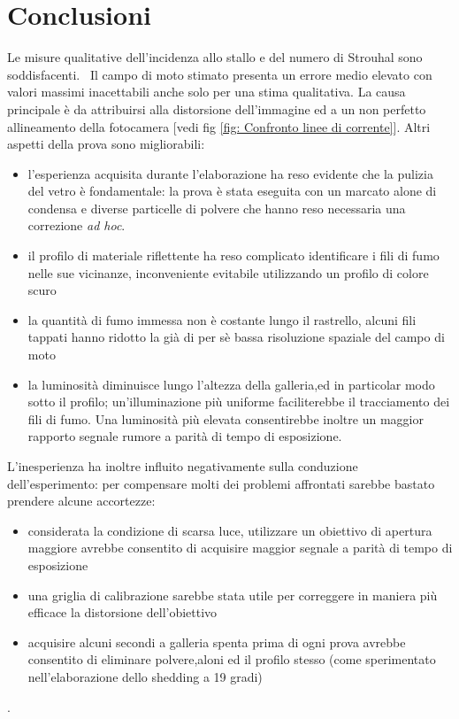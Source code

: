 \chapter{Conclusioni}
Le misure qualitative dell'incidenza allo stallo e del numero di Strouhal sono soddisfacenti. \
Il campo di moto stimato presenta un errore medio elevato con valori massimi inacettabili anche solo per una stima qualitativa. La causa principale è da attribuirsi alla distorsione dell'immagine ed a un non perfetto allineamento della fotocamera [vedi fig \ref{fig: Confronto linee di corrente}].
Altri aspetti della prova sono migliorabili:
\begin{itemize}
\item l'esperienza acquisita durante l'elaborazione ha reso evidente che la pulizia del vetro è fondamentale: la prova è stata eseguita con un marcato alone di condensa e diverse particelle di polvere che hanno reso necessaria una correzione \emph{ad hoc}.
\item il profilo di materiale riflettente ha reso complicato identificare i fili di fumo nelle sue vicinanze, inconveniente evitabile utilizzando un profilo di colore scuro
\item la quantità di fumo immessa non è costante lungo il rastrello, alcuni fili tappati hanno ridotto la già di per sè bassa risoluzione spaziale del campo di moto
\item la luminosità diminuisce lungo l'altezza della galleria,ed in particolar modo sotto il profilo; un'illuminazione più uniforme faciliterebbe il tracciamento dei fili di fumo. Una luminosità più elevata consentirebbe inoltre un maggior rapporto segnale rumore a parità di tempo di esposizione. 
\end{itemize}

L'inesperienza ha inoltre influito negativamente sulla conduzione dell'esperimento: per compensare molti dei problemi affrontati sarebbe bastato prendere alcune accortezze:
\begin{itemize}
\item considerata la condizione di scarsa luce, utilizzare un obiettivo di apertura maggiore avrebbe consentito di acquisire maggior segnale a parità di tempo di esposizione
\item una griglia di calibrazione sarebbe stata utile per correggere in maniera più efficace la distorsione dell'obiettivo
\item acquisire alcuni secondi a galleria spenta prima di ogni prova avrebbe consentito di eliminare polvere,aloni ed il profilo stesso (come sperimentato nell'elaborazione dello shedding a 19 gradi)
\end{itemize} .\
